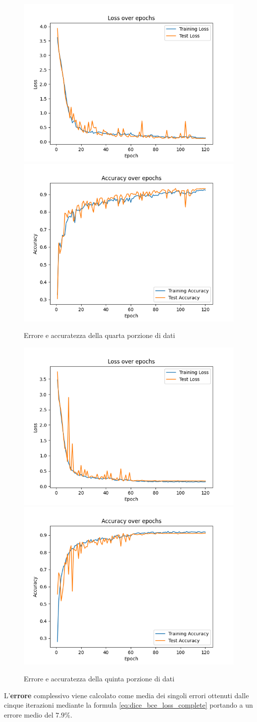 \begin{figure}
    \centering
    \includegraphics[width=0.4\columnwidth]{Immagini/fold_3_loss.png} \includegraphics[width=0.4\columnwidth]{Immagini/fold_3_accuracy.png}
    \caption{Errore e accuratezza della quarta porzione di dati}
    \label{fig:loss e accuratezza della quarta porzione di dati}
\end{figure}

\begin{figure}
    \centering
    \includegraphics[width=0.4\columnwidth]{Immagini/fold_4_loss.png} \includegraphics[width=0.4\columnwidth]{Immagini/fold_4_accuracy.png}
    \caption{Errore e accuratezza della quinta porzione di dati}
    \label{fig:loss e accuratezza della quinta porzione di dati}
\end{figure}

L'\textbf{errore} complessivo viene calcolato come media dei singoli errori
ottenuti dalle cinque iterazioni mediante la formula
\ref{eq:dice_bce_loss_complete} portando a un errore medio del
\textbf{$7.9\%$}.

